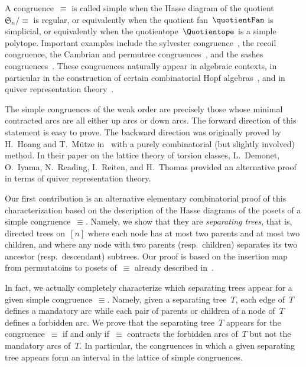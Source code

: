 \documentclass{amsart}
\theoremstyle{definition}
\newcommand{\f}[1]{{\mathfrak{#1}}} %
\newcommand{\darkblue}{\color{darkblue}} %
\newcommand{\defn}[1]{\textsl{\darkblue #1}} %
\begin{document}
A congruence~$\equiv$ is called simple when the Hasse diagram of the quotient~$\f{S}_n/{\equiv}$ is regular, or equivalently when the quotient fan~$\quotientFan$ is simplicial, or equivalently when the quotientope~$\Quotientope$ is a simple polytope.
Important examples include the sylvester congruence~\cite{Tonks, HivertNovelliThibon-algebraBinarySearchTrees}, the recoil congruence, the Cambrian and permutree congruences~\cite{Reading-CambrianLattices, PilaudPons-permutrees}, and the sashes congruences~\cite{Law,LaniniNovelli}.
These congruences naturally appear in algebraic contexts, in particular in the construction of certain combinatorial Hopf algebras~\cite{LodayRonco, HivertNovelliThibon-algebraBinarySearchTrees, ChatelPilaud, PilaudPons-permutrees}, and in quiver representation theory~\cite{DemonetIyamaReadingReitenThomas}.

The simple congruences of the weak order are precisely those whose minimal contracted arcs are all either up arcs or down arcs.
The forward direction of this statement is easy to prove.
The backward direction was originally proved by H.~Hoang and T.~Mütze in~\cite[Sect.~4.4]{HoangMutze} with a purely combinatorial (but slightly involved) method.
In their paper on the lattice theory of torsion classes, L.~Demonet, O.~Iyama, N.~Reading, I.~Reiten, and H.~Thomas provided an alternative proof~\cite[Sect.~6.3]{DemonetIyamaReadingReitenThomas} in terms of quiver representation theory.

Our first contribution is an alternative elementary combinatorial proof of this characterization based on the description of the Hasse diagrams of the posets of a simple congruence~$\equiv$.
Namely, we show that they are \defn{separating trees}, that is, directed trees on~$[n]$ where each node has at most two parents and at most two children, and where any node with two parents (resp.~children) separates its two ancestor (resp.~descendant) subtrees.
Our proof is based on the insertion map from permutatoins to posets of~$\equiv$ already described in~\cite{Pilaud-arcDiagramAlgebra}.

In fact, we actually completely characterize which separating trees appear for a given simple congruence~$\equiv$.
Namely, given a separating tree~$T$, each edge of~$T$ defines a mandatory arc while each pair of parents or children of a node of~$T$ defines a forbidden arc.
We prove that the separating tree~$T$ appears for the congruence~$\equiv$ if and only if~$\equiv$ contracts the forbidden arcs of~$T$ but not the mandatory arcs of~$T$.
In particular, the congruences in which a given separating tree appears form an interval in the lattice of simple congruences.
\end{document}
